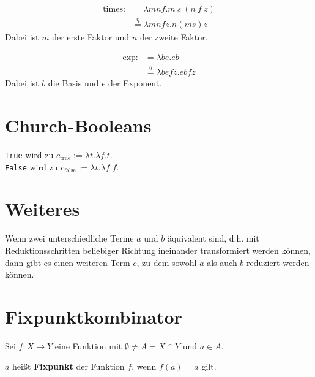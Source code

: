 \begin{beispiel}[Multiplikation]
    \begin{align*}
     \text{times} :&= \lambda m n f. m~s~(n~f~z)\\
                   &\overset{\eta}{=} \lambda m n f z. n (m s) z
    \end{align*}
    Dabei ist $m$ der erste Faktor und $n$ der zweite Faktor.
\end{beispiel}

\begin{beispiel}[Potenz]
    \begin{align*}
     \text{exp} :&= \lambda b e. eb\\
                   &\overset{\eta}{=} \lambda b e f z. e b f z
    \end{align*}
    Dabei ist $b$ die Basis und $e$ der Exponent.
\end{beispiel}

\section{Church-Booleans}
\begin{definition}%
    \texttt{True} wird zu $c_{\text{true}} := \lambda t. \lambda f. t$.\\
    \texttt{False} wird zu $c_{\text{false}} := \lambda t. \lambda f. f$.
\end{definition}

\section{Weiteres}
\begin{satz}
    Wenn zwei unterschiedliche Terme $a$ und $b$ äquivalent sind, d.h. mit Reduktionsschritten beliebiger Richtung ineinander transformiert werden können, dann gibt es einen weiteren Term $c$, zu dem sowohl $a$ als auch $b$ reduziert werden können.
\end{satz}

\section{Fixpunktkombinator}
\begin{definition}[Fixpunkt]%
    Sei $f: X \rightarrow Y$ eine Funktion mit $\emptyset \neq A = X \cap Y$ und
    $a \in A$.

    $a$ heißt \textbf{Fixpunkt} der Funktion $f$, wenn $f(a) = a$ gilt.
\end{definition}

